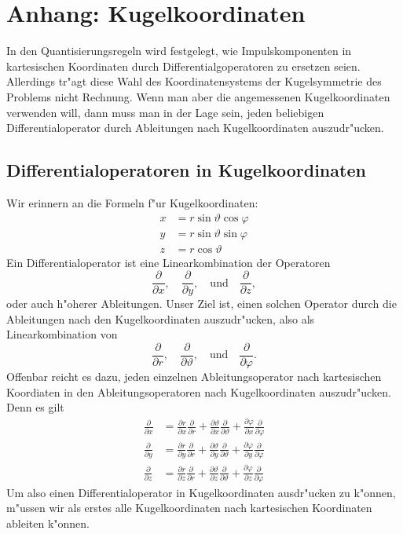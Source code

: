 \chapter{Anhang: Kugelkoordinaten}
\rhead{}
In den Quantisierungsregeln wird festgelegt, wie Impulskomponenten
in kartesischen Koordinaten durch Differentialgoperatoren zu
ersetzen seien.
Allerdings tr"agt diese Wahl des Koordinatensystems der Kugelsymmetrie
des Problems nicht Rechnung. 
Wenn man aber die angemessenen Kugelkoordinaten verwenden will,
dann muss man in der Lage sein, jeden beliebigen Differentialoperator
durch Ableitungen nach Kugelkoordinaten auszudr"ucken.

\section{Differentialoperatoren in Kugelkoordinaten}
Wir erinnern an die Formeln f"ur Kugelkoordinaten:
\begin{align*}
x&=
r\sin\vartheta\cos\varphi
\\
y&=
r\sin\vartheta\sin\varphi
\\
z&=
r\cos\vartheta
\end{align*}
Ein Differentialoperator ist eine Linearkombination der Operatoren
\[
\frac{\partial}{\partial x},
\quad
\frac{\partial}{\partial y},
\quad\text{und}\quad
\frac{\partial}{\partial z},
\]
oder auch h"oherer Ableitungen.  Unser Ziel ist, einen solchen Operator
durch die Ableitungen nach den Kugelkoordinaten auszudr"ucken, also
als Linearkombination von
\[
\frac{\partial}{\partial r},
\quad
\frac{\partial}{\partial \vartheta},
\quad\text{und}\quad
\frac{\partial}{\partial \varphi}.
\]
Offenbar reicht es dazu, jeden einzelnen Ableitungsoperator nach kartesischen
Koordiaten in den Ableitungsoperatoren nach Kugelkoordinaten auszudr"ucken.
Denn es gilt
\begin{align*}
\frac{\partial}{\partial x}
&=
\frac{\partial r}{\partial x} \frac{\partial}{\partial r}
+
\frac{\partial \vartheta}{\partial x} \frac{\partial}{\partial \vartheta}
+
\frac{\partial \varphi}{\partial x} \frac{\partial}{\partial \varphi}
\\
\frac{\partial}{\partial y}
&=
\frac{\partial r}{\partial y} \frac{\partial}{\partial r}
+
\frac{\partial \vartheta}{\partial y} \frac{\partial}{\partial \vartheta}
+
\frac{\partial \varphi}{\partial y} \frac{\partial}{\partial \varphi}
\\
\frac{\partial}{\partial z}
&=
\frac{\partial r}{\partial z} \frac{\partial}{\partial r}
+
\frac{\partial \vartheta}{\partial z} \frac{\partial}{\partial \vartheta}
+
\frac{\partial \varphi}{\partial z} \frac{\partial}{\partial \varphi}
\end{align*}
Um also einen Differentialoperator in Kugelkoordinaten ausdr"ucken zu
k"onnen, m"ussen wir als erstes alle Kugelkoordinaten nach kartesischen
Koordinaten ableiten k"onnen.

